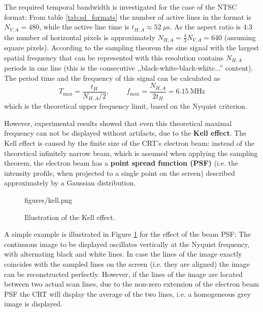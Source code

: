 The required temporal bandwidth is investigated for the case of the NTSC format:
From table \ref{tab:sd_formats} the number of active lines in the format is $N_{V,A} = 480$, while the active line time is $t_{H,A} \approx 52~\mu \mathrm{s}$.
As the aspect ratio is 4:3 the number of horizontal pixels is approximately $N_{H,A} = \frac{4}{3} N_{V,A} = 640$ (assuming square pixels).
According to the sampling theorem the sine signal with the largest spatial frequency that can be represented with this resolution contains $N_{H,A}$ periods in one line (this is the consecutive ,,black-white-black-white...'' content).
The period time and the frequency of this signal can be calculated as
\begin{equation}
T_{\mathrm{max}} = \frac{t_H}{N_{H,A}/2}, \hspace{1cm} f_{\mathrm{max}} = \frac{N_{H,A}}{2 t_H} = 6.15~\mathrm{MHz}
\end{equation}
which is the theoretical upper frequency limit, based on the Nyquist criterion.

However, experimental results showed that even this theoretical maximal frequency can not be displayed without artifacts, due to the \textbf{Kell effect}.
The Kell effect is caused by the finite size of the CRT's electron beam: instead of the theoretical infinitely narrow beam, which is assumed when applying the sampling theorem, the electron beam has a \textbf{point spread function (PSF)} (i.e. the intensity profile, when projected to a single point on the screen) described approximately by a Gaussian distribution.
\begin{figure}[]
	\centering
	\begin{minipage}[c]{0.65\textwidth}
	\begin{overpic}[width = 0.95\columnwidth ]{figures/kell.png}
	\end{overpic} \end{minipage}\hfill
	\begin{minipage}[c]{0.35\textwidth}	\caption{Illustration of the Kell effect.}
	\label{Fig:Kell}  \end{minipage}
\end{figure}

A simple example is illustrated in Figure \ref{Fig:Kell} for the effect of the beam PSF:
The continuous image to be displayed oscillates vertically at the Nyquist frequency, with alternating black and white lines.
In case the lines of the image exactly coincides with the sampled lines on the screen (i.e. they are aligned) the image can be reconstructed perfectly.
However, if the lines of the image are located between two actual scan lines, due to the non-zero extension of the electron beam PSF the CRT will display the average of the two lines, i.e. a homogeneous grey image is displayed.

